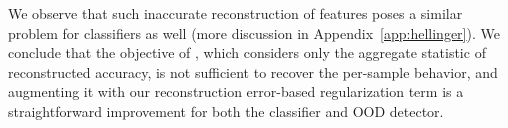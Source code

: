 We observe that such inaccurate reconstruction of features poses a similar problem for classifiers as well (more discussion in Appendix~\ref{app:hellinger}).
We conclude that the objective of \citet{yeh2020completeness}, which considers only the aggregate statistic of reconstructed accuracy, is not sufficient to recover the per-sample behavior, and augmenting it with our reconstruction error-based regularization term is a straightforward improvement for both the classifier and OOD detector.

 
\iffalse

